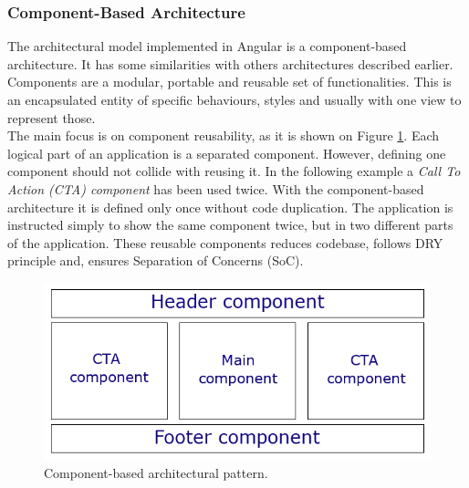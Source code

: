 \documentclass{article} %
\begin{document}
\subsubsection{Component-Based Architecture}
The architectural model implemented in Angular is a component-based architecture. It has some similarities with others architectures described earlier. Components are a modular, portable and reusable set of functionalities. This is an encapsulated entity of specific behaviours, styles and usually with one view to represent those.\\
\newline
The main focus is on component reusability, as it is shown on Figure \ref{fig:component-based}. Each logical part of an application is a separated component. However, defining one component should not collide with reusing it. In the following example a \textit{Call To Action (CTA) component} has been used twice. With the component-based architecture it is defined only once without code duplication. The application is instructed simply to show the same component twice, but in two different parts of the application. These reusable components reduces codebase, follows DRY principle and, ensures Separation of Concerns (SoC).
\begin{figure}[ht]
  \centering
      \includegraphics[width=1\textwidth]{component-based.png}
  \caption{Component-based architectural pattern.}
  \label{fig:component-based}
\end{figure}
\end{document}
